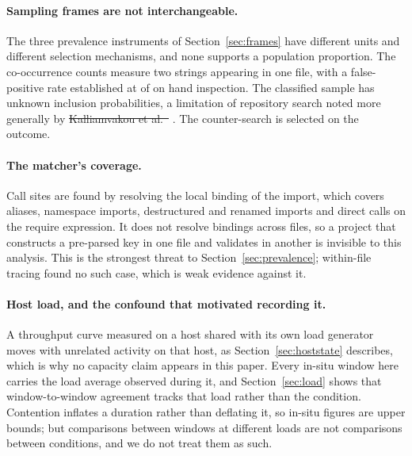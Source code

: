 \documentclass[pdflatex,sn-basic,twocolumn]{sn-jnl}%
\providecommand{\DIFdel}[1]{{\protect\color{red}\sout{#1}}}                      %
\providecommand{\DIFaddbegin}{} %
\providecommand{\DIFaddend}{} %
\providecommand{\DIFdelbegin}{} %
\providecommand{\DIFdelend}{} %
\newcommand{\DIFscaledelfig}{0.5}
\newlength{\DIFdelgraphicswidth} %
\newlength{\DIFdelgraphicsheight} %
\newcommand{\DIFaddincludegraphics}[2][]{{\color{blue}\fbox{\DIFOincludegraphics[#1]{#2}}}} %
\newcommand{\DIFdelincludegraphics}[2][]{%
\sbox{\DIFdelgraphicsbox}{\DIFOincludegraphics[#1]{#2}}%
\settoboxwidth{\DIFdelgraphicswidth}{\DIFdelgraphicsbox} %
\settoboxtotalheight{\DIFdelgraphicsheight}{\DIFdelgraphicsbox} %
\scalebox{\DIFscaledelfig}{%
\parbox[b]{\DIFdelgraphicswidth}{\usebox{\DIFdelgraphicsbox}\\[-\baselineskip] \rule{\DIFdelgraphicswidth}{0em}}\llap{\resizebox{\DIFdelgraphicswidth}{\DIFdelgraphicsheight}{%
\setlength{\unitlength}{\DIFdelgraphicswidth}%
\begin{picture}(1,1)%
\thicklines\linethickness{2pt} %
{\color[rgb]{1,0,0}\put(0,0){\framebox(1,1){}}}%
{\color[rgb]{1,0,0}\put(0,0){\line( 1,1){1}}}%
{\color[rgb]{1,0,0}\put(0,1){\line(1,-1){1}}}%
\end{picture}%
}\hspace*{3pt}}} %
} %
\DeclareRobustCommand{\DIFaddbegin}{\DIFOaddbegin \let\includegraphics\DIFaddincludegraphics} %
\DeclareRobustCommand{\DIFaddend}{\DIFOaddend \let\includegraphics\DIFOincludegraphics} %
\DeclareRobustCommand{\DIFdelbegin}{\DIFOdelbegin \let\includegraphics\DIFdelincludegraphics} %
\DeclareRobustCommand{\DIFdelend}{\DIFOaddend \let\includegraphics\DIFOincludegraphics} %
\begin{document}
\paragraph{Sampling frames are not interchangeable.} The three prevalence
instruments of Section~\ref{sec:frames} have different units and different
selection mechanisms, and none supports a population proportion. The
co-occurrence counts measure two strings appearing in one file, with a
false-positive rate established at \AdjudicatedFalsePositive{} of
\AdjudicatedTotal{} on hand inspection. The classified sample has unknown
inclusion probabilities, a limitation of repository search noted more generally
by \DIFdelbegin \DIFdel{Kalliamvakou et al.~}%
\DIFdelend \DIFaddbegin \citet{kalliamvakou2014promises}\DIFaddend . The counter-search is
selected on the outcome.

\paragraph{The matcher's coverage.} Call sites are found by resolving the local
binding of the import, which covers aliases, namespace imports, destructured and
renamed imports and direct calls on the require expression. It does not resolve
bindings across files, so a project that constructs a pre-parsed key in one file
and validates in another is invisible to this analysis. This is the strongest
threat to Section~\ref{sec:prevalence}; within-file tracing found no such case,
which is weak evidence against it.

\paragraph{Host load, and the confound that motivated recording it.} A
throughput curve measured on a host shared with its own load generator moves with
unrelated activity on that host, as Section~\ref{sec:hoststate} describes, which
is why no capacity claim appears in this paper. Every in-situ window here carries
the load average observed during it, and Section~\ref{sec:load} shows that window-to-window
agreement tracks that load rather than the condition. Contention inflates a
duration rather than deflating it, so in-situ figures are upper bounds; but
comparisons between windows at different loads are not comparisons between
conditions, and we do not treat them as such.
\end{document}
